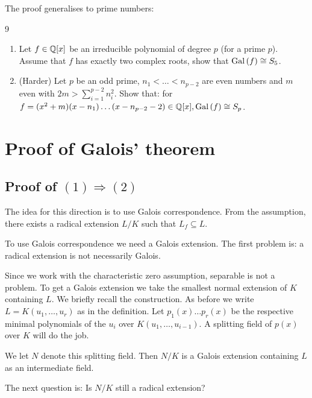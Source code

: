 \documentclass[twoside = false,	%
		headsepline,		%
		parskip = true,
		]{scrbook}						%
\begin{document}
        The proof generalises to prime numbers:
        \begin{exercise}{}{9}
            \begin{enumerate}
                \item Let $f\in \mathbb Q[x]$ be an irreducible polynomial of degree $p$ (for a prime $p$). Assume that $f$ has exactly two complex roots, show that $\mathrm{Gal}\left( f\right)\cong S_5$.
                \item (Harder) Let $p$ be an odd prime, $n_1<\dots<n_{p-2}$ are even numbers and $m$ even with $2m>\sum_{i=1}^{p-2}n_i^2$. Show that: for $f=(x^2+m)(x-n_1)\dots(x-n_{p-2}-2) \in \mathbb Q[x], \mathrm{Gal}\left( f\right)\cong S_p$.
            \end{enumerate}
        \end{exercise}
        
%             
    
    
\section{Proof of Galois' theorem}
    \subsection*{Proof of $(1) \Rightarrow (2)$}
    The idea for this direction is to use Galois correspondence. From the assumption, there exists a radical extension $L/K$ such that $L_f \subseteq L$.
    
    To use Galois correspondence we need a Galois extension. The first problem is: a radical extension is not necessarily Galois.
    
    Since we work with the characteristic zero assumption, separable is not a problem. To get a Galois extension we take the smallest normal extension of $K$ containing $L$. We briefly recall the construction. As before we write $L = K(u_1,\dots,u_r)$ as in the definition. Let $p_1(x) \dots p_r(x)$ be the respective minimal polynomials of the $u_i$ over $K(u_1,\dots, u_{i-1})$. A splitting field of $p(x)$ over $K$ will do the job.
    
    We let $N$ denote this splitting field. Then $N/K$ is a Galois extension containing $L$ as an intermediate field.
    
    The next question is: Is $N/K$ still a radical extension?
    
\end{document}
